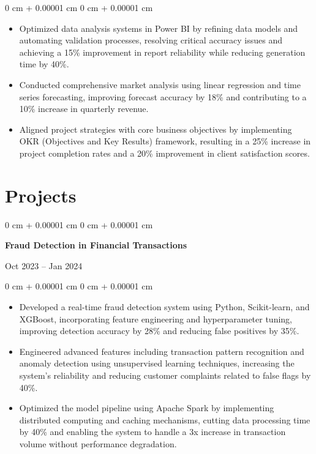 \documentclass[9pt, letterpaper]{article}
\newenvironment{highlights}{
    \begin{itemize}[
        topsep=0.03 cm,  %
        parsep=0.03 cm,  %
        partopsep=0pt,
        itemsep=0pt,
        leftmargin=0 cm + 8pt %
    ]
    \justifying
}{
    \end{itemize}
}
\newenvironment{onecolentry}{
    \begin{adjustwidth}{
        0 cm + 0.00001 cm
    }{
        0 cm + 0.00001 cm
    }
}{
    \end{adjustwidth}
}
\newenvironment{twocolentry}[2][]{
    \onecolentry
    \def\secondColumn{#2}
    \setcolumnwidth{\fill, 4.3 cm}  %
    \begin{paracol}{2}
}{
    \switchcolumn \raggedleft \secondColumn
    \end{paracol}
    \endonecolentry
}
\begin{document}
\vspace{0.05 cm}

\begin{onecolentry}
    \begin{highlights}
        \item Optimized data analysis systems in Power BI by refining data models and automating validation processes, resolving critical accuracy issues and achieving a 15\% improvement in report reliability while reducing generation time by 40\%.
        \item Conducted comprehensive market analysis using linear regression and time series forecasting, improving forecast accuracy by 18\% and contributing to a 10\% increase in quarterly revenue.
        \item Aligned project strategies with core business objectives by implementing OKR (Objectives and Key Results) framework, resulting in a 25\% increase in project completion rates and a 20\% improvement in client satisfaction scores.
    \end{highlights}
\end{onecolentry}

\section{Projects}

\begin{twocolentry}{
    Oct 2023 – Jan 2024
}
    \textbf{Fraud Detection in Financial Transactions}
\end{twocolentry}

\vspace{0.05 cm}

\begin{onecolentry}
    \begin{highlights}
        \item Developed a real-time fraud detection system using Python, Scikit-learn, and XGBoost, incorporating feature engineering and hyperparameter tuning, improving detection accuracy by 28\% and reducing false positives by 35\%.
        \item Engineered advanced features including transaction pattern recognition and anomaly detection using unsupervised learning techniques, increasing the system's reliability and reducing customer complaints related to false flags by 40\%.
        \item Optimized the model pipeline using Apache Spark by implementing distributed computing and caching mechanisms, cutting data processing time by 40\% and enabling the system to handle a 3x increase in transaction volume without performance degradation.
    \end{highlights}
\end{onecolentry}
\end{document}
